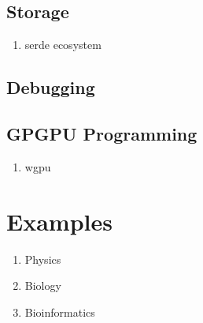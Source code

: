 \documentclass{article}
\begin{document}
\subsection{Storage}
\label{subsection:storage}

\begin{enumerate}
    \item serde ecosystem~\cite{TolnaySerde2024,TolnaySerdeJson2025}
\end{enumerate}

\subsection{Debugging}
\label{subsection:debugging}

\subsection{GPGPU Programming}
\label{subsection:gpgpu}

\begin{enumerate}
    \item wgpu~\cite{Fitzgerald2025}
\end{enumerate}

\section{Examples}
\label{section:examples}

\begin{enumerate}
    \item Physics~\cite{}
    \item Biology~\cite{Pleyer2024}
    \item Bioinformatics~\cite{}
\end{enumerate}



\end{document}
